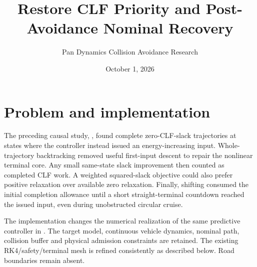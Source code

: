 \documentclass[11pt]{article}
\title{Restore CLF Priority and Post-Avoidance Nominal Recovery}
\author{Pan Dynamics Collision Avoidance Research}
\date{October 1, 2026}
\begin{document}
\maketitle

\section{Problem and implementation}
The preceding causal study, ,
found complete zero-CLF-slack trajectories at states where the controller
instead issued an energy-increasing input. Whole-trajectory backtracking
removed useful first-input descent to repair the nonlinear terminal core.
Any small same-state slack improvement then counted as completed CLF work.
A weighted squared-slack objective could also prefer positive relaxation
over available zero relaxation. Finally, shifting consumed the initial
completion allowance until a short straight-terminal countdown reached the
issued input, even during unobstructed circular cruise.

The implementation changes the numerical realization of the same predictive
controller in . The target model,
continuous vehicle dynamics, nominal path, collision buffer and physical
admission constraints are retained. The existing RK4/safety/terminal mesh
is refined consistently as described below. Road boundaries remain absent.
\end{document}

